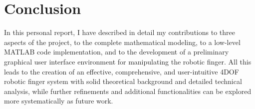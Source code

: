 \documentclass[a4paper,12pt]{article}
\begin{document}
\section{Conclusion}
In this personal report, I have described in detail my contributions to three aspects of the project, to the complete mathematical modeling, to a low-level MATLAB code implementation, and to the development of a preliminary graphical user interface environment for manipulating the robotic finger. All this leads to the creation of an effective, comprehensive, and user-intuitive 4DOF robotic finger system with solid theoretical background and detailed technical analysis, while further refinements and additional functionalities can be explored more systematically as future work.\\

\newpage

\nocite{*}


\end{document}
